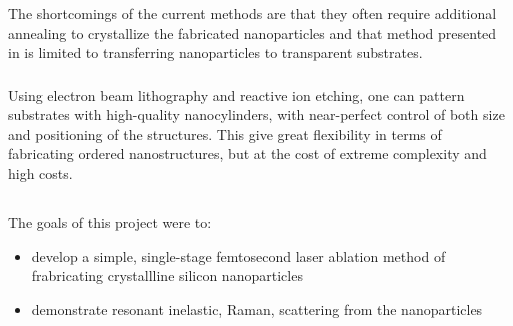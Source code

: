                 The shortcomings of the current methods are that they often require additional annealing to crystallize the fabricated nanoparticles and that
            method presented in \cite{zywietz2014laser} is limited to transferring nanoparticles to transparent substrates.


        \subsubsection{}
                Using electron beam lithography and reactive ion etching, one can pattern substrates with high-quality nanocylinders, with near-perfect
            control of both size and positioning of the structures\cite{bakker2015magnetic}. This give great flexibility in terms of fabricating ordered nanostructures, but at the
            cost of extreme complexity and high costs.

    \subsection{}
            The goals of this project were to:
            \begin{itemize}
                \item develop a simple, single-stage femtosecond laser ablation method of frabricating crystallline silicon nanoparticles
                \item demonstrate resonant inelastic, Raman, scattering from the nanoparticles
            \end{itemize}

\clearpage
